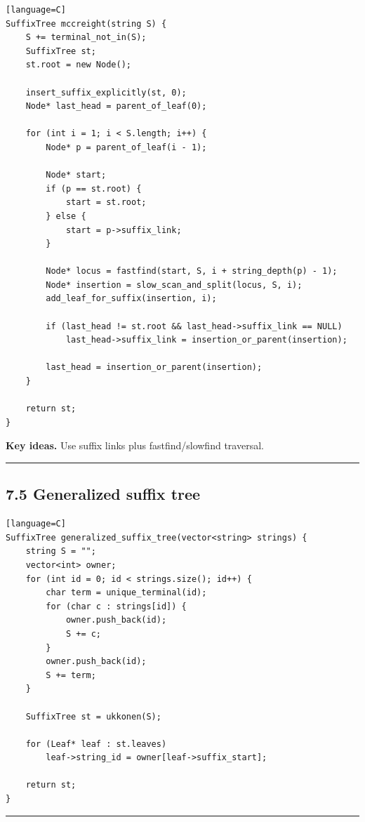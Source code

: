 \documentclass[11pt]{article}
\begin{document}
\begin{verbatim}[language=C]
SuffixTree mccreight(string S) {
    S += terminal_not_in(S);
    SuffixTree st;
    st.root = new Node();

    insert_suffix_explicitly(st, 0);
    Node* last_head = parent_of_leaf(0);

    for (int i = 1; i < S.length; i++) {
        Node* p = parent_of_leaf(i - 1);

        Node* start;
        if (p == st.root) {
            start = st.root;
        } else {
            start = p->suffix_link;
        }

        Node* locus = fastfind(start, S, i + string_depth(p) - 1);
        Node* insertion = slow_scan_and_split(locus, S, i);
        add_leaf_for_suffix(insertion, i);

        if (last_head != st.root && last_head->suffix_link == NULL)
            last_head->suffix_link = insertion_or_parent(insertion);

        last_head = insertion_or_parent(insertion);
    }

    return st;
}
\end{verbatim}

\textbf{Key ideas.} Use suffix links plus fastfind/slowfind traversal.

\begin{center}\rule{0.5\linewidth}{0.5pt}\end{center}

\subsection{7.5 Generalized suffix tree}\label{generalized-suffix-tree}

\begin{verbatim}[language=C]
SuffixTree generalized_suffix_tree(vector<string> strings) {
    string S = "";
    vector<int> owner;
    for (int id = 0; id < strings.size(); id++) {
        char term = unique_terminal(id);
        for (char c : strings[id]) {
            owner.push_back(id);
            S += c;
        }
        owner.push_back(id);
        S += term;
    }

    SuffixTree st = ukkonen(S);

    for (Leaf* leaf : st.leaves)
        leaf->string_id = owner[leaf->suffix_start];

    return st;
}
\end{verbatim}

\begin{center}\rule{0.5\linewidth}{0.5pt}\end{center}
\end{document}
